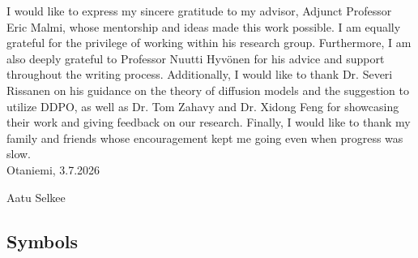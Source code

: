 \documentclass[english, 12pt, a4paper, sci, utf8, a-2b, online]{aaltothesis}
\theoremstyle{definition}
\theoremstyle{plain}
\theoremstyle{remark}
\begin{document}

I would like to express my sincere gratitude to my advisor, Adjunct Professor Eric Malmi, whose mentorship and ideas made this work possible. I am equally grateful for the privilege of working within his research group. Furthermore, I am also deeply grateful to Professor Nuutti Hyvönen for his advice and support throughout the writing process. Additionally, I would like to thank Dr. Severi Rissanen on his guidance on the theory of diffusion models and the suggestion to utilize DDPO, as well as Dr. Tom Zahavy and Dr. Xidong Feng for showcasing their work and giving feedback on our research. Finally, I would like to thank my family and friends whose encouragement kept me going even when progress was slow. \\

\vspace{5cm}
Otaniemi, 3.7.2026

\vspace{5mm}
{\hfill Aatu Selkee \hspace{1cm}}

\newpage


\thesistableofcontents



\subsection*{Symbols}
\end{document}
